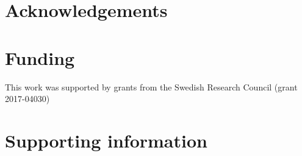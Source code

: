 \documentclass[10pt,letterpaper]{article}
\begin{document}
\section*{Acknowledgements}


\section*{Funding}

This work was supported by grants from the Swedish Research Council (grant 2017-04030) 

\section*{Supporting information}


%

\end{document}
